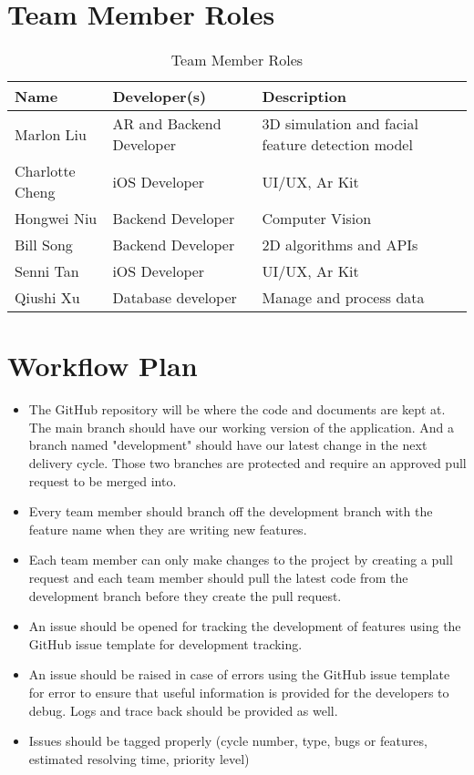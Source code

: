 \documentclass{article}
\begin{document}
\section{Team Member Roles}

\begin{table}[hp]
\caption{Team Member Roles} \label{TblMembers}
\begin{tabularx}{\textwidth}{llX}
\toprule
\textbf{Name} & \textbf{Developer(s)} & \textbf{Description}\\
\midrule
Marlon Liu & AR and Backend Developer & 3D simulation and facial feature detection model \\
\midrule
Charlotte Cheng & iOS Developer & UI/UX, Ar Kit\\
\midrule
Hongwei Niu & Backend Developer & Computer Vision\\
\midrule
Bill Song & Backend Developer & 2D algorithms and APIs\\
\midrule
Senni Tan & iOS Developer & UI/UX, Ar Kit\\
\midrule
Qiushi Xu & Database developer & Manage and process data\\ 
\bottomrule
\end{tabularx}
\end{table}

\section{Workflow Plan}

\begin{itemize}
    \item The GitHub repository will be where the code and documents are kept at. The main branch should have our working version of the application. And a branch named "development" should have our latest change in the next delivery cycle. Those two branches are protected and require an approved pull request to be merged into.
    \item Every team member should branch off the development branch with the feature name when they are writing new features.
    \item Each team member can only make changes to the project by creating a pull request and each team member should pull the latest code from the development branch before they create the pull request.
    \item An issue should be opened for tracking the development of features using the GitHub issue template for development tracking.
    \item An issue should be raised in case of errors using the GitHub issue template for error to ensure that useful information is provided for the developers to debug. Logs and trace back should be provided as well.
    \item Issues should be tagged properly (cycle number, type, bugs or features, estimated resolving time, priority level)
\end{itemize}
\end{document}
